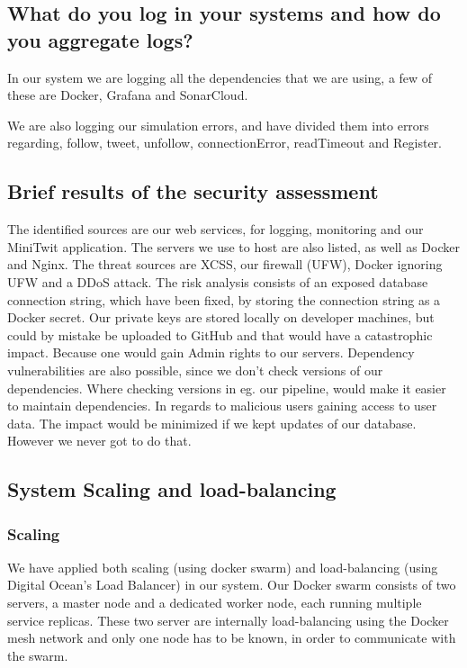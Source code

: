 \subsection{What do you log in your systems and how do you aggregate logs?}
In our system we are logging all the dependencies that we are using, a few of these are Docker, Grafana and SonarCloud. 

We are also logging our simulation errors, and have divided them into errors regarding, follow, tweet, unfollow, connectionError, readTimeout and Register.


\subsection{Brief results of the security assessment}
The identified sources are our web services, for logging, monitoring and our MiniTwit application.
The servers we use to host are also listed, as well as Docker and Nginx.
The threat sources are XCSS, our firewall (UFW), Docker ignoring UFW and a DDoS attack.
The risk analysis consists of an exposed database connection string, which have been fixed, by storing the connection string as a Docker secret. Our private keys are stored locally on developer machines, but could by mistake be uploaded to GitHub and that would have a catastrophic impact. Because one would gain Admin rights to our servers.
Dependency vulnerabilities are also possible, since we don't check versions of our dependencies. Where checking versions in eg. our pipeline, would make it easier to maintain dependencies.
In regards to malicious users gaining access to user data. The impact would be minimized if we kept updates of our database. However we never got to do that.

\subsection{System Scaling and load-balancing}
\subsubsection{Scaling}
We have applied both scaling (using docker swarm) and load-balancing (using Digital Ocean's Load Balancer) in our system. 
Our Docker swarm consists of two servers, a master node and a dedicated worker node, each running multiple service replicas. 
These two server are internally load-balancing using the Docker mesh network and only one node has to be known, in order to communicate with the swarm.

